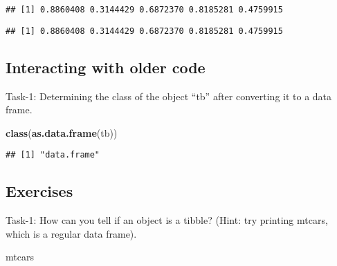\documentclass[
]{article}
\newenvironment{Shaded}{\begin{snugshade}}{\end{snugshade}}
\newcommand{\FunctionTok}[1]{\textcolor[rgb]{0.13,0.29,0.53}{\textbf{#1}}}
\newcommand{\NormalTok}[1]{#1}
\newcommand{\SpecialCharTok}[1]{\textcolor[rgb]{0.81,0.36,0.00}{\textbf{#1}}}
\begin{document}
\begin{verbatim}
## [1] 0.8860408 0.3144429 0.6872370 0.8185281 0.4759915
\end{verbatim}

\begin{Shaded}
\end{Shaded}

\begin{verbatim}
## [1] 0.8860408 0.3144429 0.6872370 0.8185281 0.4759915
\end{verbatim}

\hypertarget{interacting-with-older-code}{%
\subsection{Interacting with older
code}\label{interacting-with-older-code}}

Task-1: Determining the class of the object ``tb'' after converting it
to a data frame.

\begin{Shaded}
\begin{Highlighting}[]
\FunctionTok{class}\NormalTok{(}\FunctionTok{as.data.frame}\NormalTok{(tb))}
\end{Highlighting}
\end{Shaded}

\begin{verbatim}
## [1] "data.frame"
\end{verbatim}

\hypertarget{exercises}{%
\subsection{Exercises}\label{exercises}}

Task-1: How can you tell if an object is a tibble? (Hint: try printing
mtcars, which is a regular data frame).

\begin{Shaded}
\begin{Highlighting}[]
\NormalTok{mtcars}
\end{Highlighting}
\end{Shaded}
\end{document}
